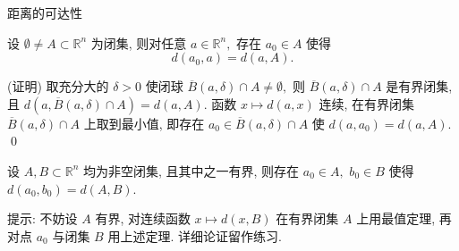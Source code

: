 
\begin{frame}{距离的可达性}

\begin{thm}[点到闭集的距离可达]
设 $\emptyset \neq A \subset \mathbb{R}^n$ 为闭集, 则对任意 $a \in \mathbb{R}^n,$ 存在 $a_0 \in A$ 使得
\[
d(a_0, a) = d(a, A).
\]
\end{thm}

\pause

\startproof[bg=yellow, fg=red](证明)
取充分大的 $\delta > 0$ 使闭球 $\overline{B}(a, \delta) \cap A \neq \emptyset,$ 则 $\overline{B}(a, \delta) \cap A$ 是有界闭集, 且
$d(a, \overline{B}(a, \delta) \cap A) = d(a, A).$
函数 $x \mapsto d(a, x)$ 连续, 在有界闭集 $\overline{B}(a, \delta) \cap A$ 上取到最小值, 即存在 $a_0 \in \overline{B}(a, \delta) \cap A$ 使 $d(a, a_0) = d(a, A).$
\qed

\pause

\begin{cor}[集合间距离的可达性]
设 $A, B \subset \mathbb{R}^n$ 均为非空闭集, 且其中之一有界, 则存在 $a_0 \in A,$ $b_0 \in B$ 使得 $d(a_0, b_0) = d(A, B).$
\end{cor}

\begin{remark}
提示: 不妨设 $A$ 有界, 对连续函数 $x \mapsto d(x, B)$ 在有界闭集 $A$ 上用最值定理, 再对点 $a_0$ 与闭集 $B$ 用上述定理. 详细论证留作练习.
\end{remark}

\end{frame}




